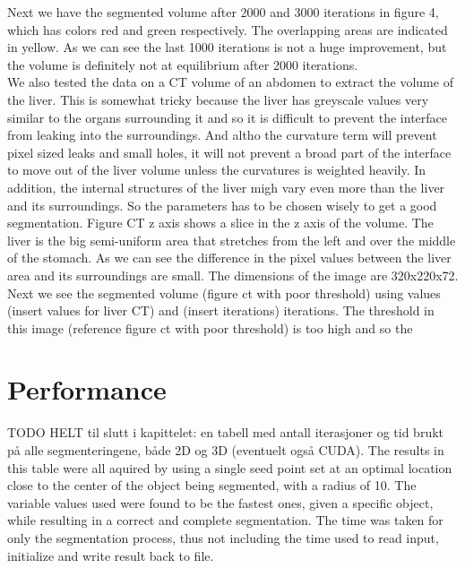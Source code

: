 Next we have the segmented volume after 2000 and 3000 iterations in figure 4, which has colors red and green respectively. The overlapping areas are indicated in yellow. As we can see the last 1000 iterations is not a huge improvement, but the volume is definitely not at equilibrium after 2000 iterations. 
\\
We also tested the data on a CT volume of an abdomen to extract the volume of the liver. This is somewhat tricky because the liver has greyscale values very similar to the organs surrounding it and so it is difficult to prevent the interface from leaking into the surroundings. And altho the curvature term will prevent pixel sized leaks and small holes, it will not prevent a broad part of the interface to move out of the liver volume unless the curvatures is weighted heavily. In addition, the internal structures of the liver migh vary even more than the liver and its surroundings. So the parameters has to be chosen wisely to get a good segmentation. Figure CT z axis shows a slice in the z axis of the volume. The liver is the big semi-uniform area that stretches from the left and over the middle of the stomach. As we can see the difference in the pixel values between the liver area and its surroundings are small. The dimensions of the image are 320x220x72. Next we see the segmented volume (figure ct with poor threshold) using values (insert values for liver CT) and (insert iterations) iterations. The threshold in this image (reference figure ct with poor threshold) is too high and so the 

\section{Performance}
TODO 
HELT til slutt i kapittelet: en tabell med antall iterasjoner og tid brukt på alle segmenteringene, både 2D og 3D (eventuelt også CUDA). The results in this table were all aquired by using a single seed point set at an optimal location close to the center of the object being segmented, with a radius of 10. The variable values used were found to be the fastest ones, given a specific object, while resulting in a correct and complete segmentation. The time was taken for only the segmentation process, thus not including the time used to read input, initialize and write result back to file.